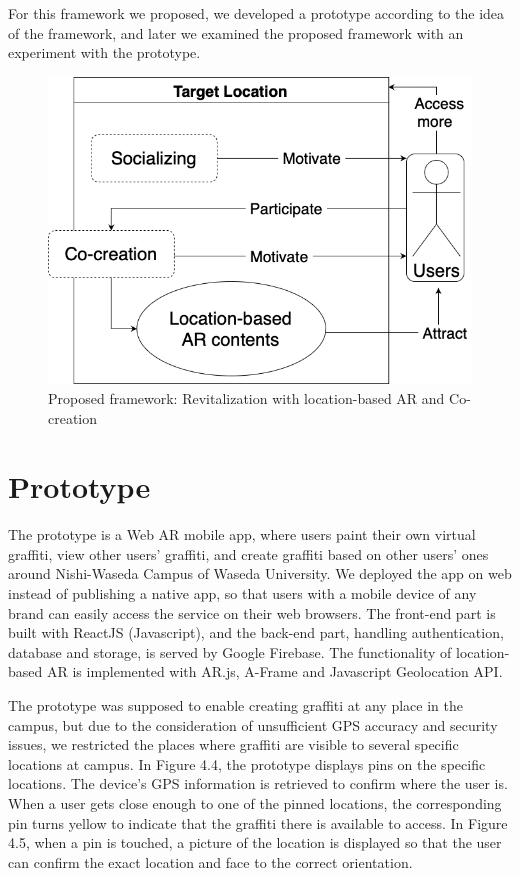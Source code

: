 For this framework we proposed, we developed a prototype according to the idea of the framework, and later we examined the proposed framework with an experiment with the prototype.

\begin{figure}
  \centering
  \includegraphics[width=0.85\columnwidth]{resources/4_methodology/proposed_framework_revitalization_with_AR_and_cocreation.png}
    \caption{Proposed framework: Revitalization with location-based AR and Co-creation}
\end{figure}

\section{Prototype}
The prototype is a Web AR mobile app, where users paint their own virtual graffiti, view other users' graffiti, and create graffiti based on other users' ones around Nishi-Waseda Campus of Waseda University.
We deployed the app on web instead of publishing a native app, so that users with a mobile device of any brand can easily access the service on their web browsers.
The front-end part is built with ReactJS (Javascript), and the back-end part, handling authentication, database and storage, is served by Google Firebase.
The functionality of location-based AR is implemented with AR.js, A-Frame and Javascript Geolocation API.

The prototype was supposed to enable creating graffiti at any place in the campus, but due to the consideration of unsufficient GPS accuracy and security issues,
we restricted the places where graffiti are visible to several specific locations at campus.
In Figure 4.4, the prototype displays pins on the specific locations. The device's GPS information is retrieved to confirm where the user is.
When a user gets close enough to one of the pinned locations, the corresponding pin turns yellow to indicate that the graffiti there is available to access.
In Figure 4.5, when a pin is touched, a picture of the location is displayed so that the user can confirm the exact location and face to the correct orientation.

